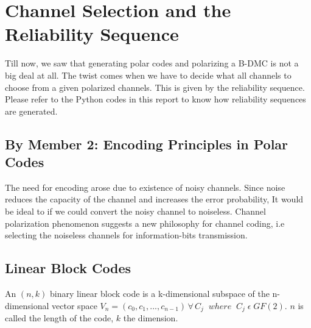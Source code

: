 \documentclass{report}
\begin{document}
\section*{Channel Selection and the Reliability Sequence}
Till now, we saw that generating polar codes and polarizing a B-DMC is not a big deal at all. The twist comes when we have to decide what all channels to choose from a given polarized channels. This is given by the reliability sequence. Please refer to the Python codes in this report to know how reliability sequences are generated.

\newpage
\subsection*{By Member 2: Encoding Principles in Polar Codes}
The need for encoding arose due to existence of noisy channels. Since noise reduces the capacity of the channel and increases the error probability, It would be ideal to if we could convert the noisy channel to noiseless. Channel polarization phenomenon suggests a new philosophy for channel coding, i.e selecting the noiseless channels for information-bits transmission.

\subsection*{Linear Block Codes}
An $(n, k)$ binary linear block code is a k-dimensional subspace of the n-dimensional vector space $ V_n =  ( c_0,c_1,...,c_{n-1} ) \, \forall \, C_j \;\; where \;\; C_j \; \epsilon \; GF(2)$.  $n$ is called the length of the code, $k$ the dimension.
\end{document}
